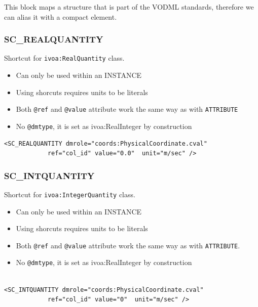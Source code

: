 \documentclass[11pt,a4paper]{ivoa}
\begin{document}
This block maps a structure that is part of the VODML standards, therefore we can alias it with a compact element.

\subsubsection{SC\_REALQUANTITY}
Shortcut for \texttt{ivoa:RealQuantity} class.

\begin{itemize}
    \item Can only be used within an INSTANCE      
    \item Using shorcuts requires units to be literals   
    \item Both \texttt{@ref} and \texttt{@value} attribute work the same way as with \texttt{ATTRIBUTE}
    \item No \texttt{@dmtype},  it is set as ivoa:RealInteger by construction
 \end{itemize}


\begin{lstlisting}[caption={\texttt{ivoa:RealQuantity} example},style=XML]
<SC_REALQUANTITY dmrole="coords:PhysicalCoordinate.cval"
            ref="col_id" value="0.0"  unit="m/sec" />
\end{lstlisting}


\subsubsection{SC\_INTQUANTITY}
Shortcut for \texttt{ivoa:IntegerQuantity} class.

\begin{itemize}
    \item Can only be used within an INSTANCE        
    \item Using shorcuts requires units to be literals    
    \item Both \texttt{@ref} and \texttt{@value} attribute work the same way as with \texttt{ATTRIBUTE}.
    \item No \texttt{@dmtype},  it is set as ivoa:RealInteger by construction
 \end{itemize}


\begin{lstlisting}[caption={\texttt{ivoa:IntegerQuantity} example},style=XML,basicstyle=\small]

<SC_INTQUANTITY dmrole="coords:PhysicalCoordinate.cval"
            ref="col_id" value="0"  unit="m/sec" />
\end{lstlisting}
\end{document}
